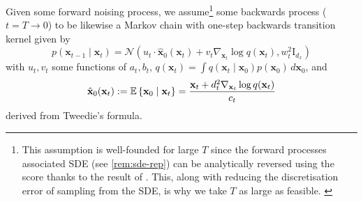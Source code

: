 \begin{definition} \label{def:backwards-process}
    Given some forward noising process, we assume\footnote{This assumption is well-founded for
    large $T$ since the forward processes associated SDE (see \autoref{rem:sde-rep}) can be
    analytically reversed using the score thanks to the result of
    \textcite{andersonReversetimeDiffusionEquation1982}. This, along with reducing the
    discretisation error of sampling from the SDE, is why we take $T$ as large as feasible.
    \label{ftnt:sde-rep}} some backwards process ($t=T \to 0$) to be likewise a Markov chain with
    one-step backwards transition kernel given by
    \begin{equation}
        p(\mathbf{x}_{t-1} \mid \mathbf{x}_t) = \mathcal{N}\left(u_t\cdot \hat{\mathbf{x}}_0(\mathbf{x}_t) + v_t\nabla_{\mathbf{x}_t}\log q(\mathbf{x}_t), w_t^2\mathrm{I}_{d_x}\right) \label{eq:backwards-process}
    \end{equation}
    with $u_t, v_t$ some functions of $a_t, b_t$,
    $q(\mathbf{x}_t) = \int q(\mathbf{x}_t \mid \mathbf{x}_0)p(\mathbf{x}_0)\, d\mathbf{x}_0$, and
    \begin{equation}
        \hat{\mathbf{x}}_0(\mathbf{x}_t) := \mathbb{E} \left\{ \mathbf{x}_0 \mid \mathbf{x}_t \right\} = \frac{\mathbf{x}_t + d_t^2\nabla_{\mathbf{x}_t}\log q(\mathbf{x}_t)}{c_t} \label{eq:tweedie}
    \end{equation}
    derived from Tweedie's formula.
\end{definition}


